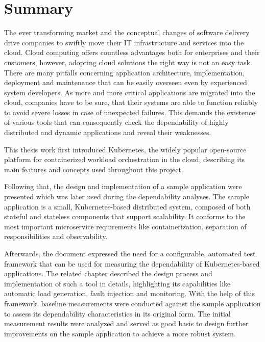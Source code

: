 \chapter{Summary}

The ever transforming market and the conceptual changes of software delivery drive companies to swiftly move their IT infrastructure and services into the cloud. Cloud computing offers countless advantages both for enterprises and their customers, however, adopting cloud solutions the right way is not an easy task. There are many pitfalls concerning application architecture, implementation, deployment and maintenance that can be easily overseen even by experienced system developers. As more and more critical applications are migrated into the cloud, companies have to be sure, that their systems are able to function reliably to avoid severe losses in case of unexpected failures. This demands the existence of various tools that can consequently check the dependability of highly distributed and dynamic applications and reveal their weaknesses.

This thesis work first introduced Kubernetes, the widely popular open-source platform for containerized workload orchestration in the cloud, describing its main features and concepts used throughout this project.

Following that, the design and implementation of a sample application were presented which was later used during the dependability analyses. The sample application is a small, Kubernetes-based distributed system, composed of both stateful and stateless components that support scalability. It conforms to the most important microservice requirements like containerization, separation of responsibilities and observability.

Afterwards, the document expressed the need for a configurable, automated test framework that can be used for measuring the dependability of Kubernetes-based applications. The related chapter described the design process and implementation of such a tool in details, highlighting its capabilities like automatic load generation, fault injection and monitoring. With the help of this framework, baseline measurements were conducted against the sample application to assess its dependability characteristics in its original form. The initial measurement results were analyzed and served as good basis to design further improvements on the sample application to achieve a more robust system.

